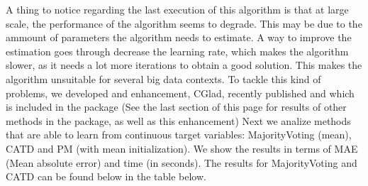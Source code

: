 \documentclass[letterpaper,10pt,english]{sphinxmanual}
\begin{document}
A thing to notice regarding the last execution of this algorithm is that at large scale, the performance of the
algorithm seems to degrade. 
This may be due to the ammount of parameters the algorithm needs to estimate. 
A way to improve the estimation goes through decrease the learning rate, which
makes the algorithm slower, as it needs a lot more iterations to obtain a good solution. 
This makes the algorithm
unsuitable for several big data contexts.  To tackle this kind of problems, we developed and enhancement, CGlad, recently
published and which is included in the package (See the last section of this page for results of other
methods in the package, as well as this enhancement)
Next we analize methods that are able to learn from continuous target variables: MajorityVoting (mean), CATD and PM (with mean initialization). We show the results in terms of MAE (Mean absolute error) and time (in seconds). The
results for MajorityVoting and CATD can be found below in the table below.
\end{document}
